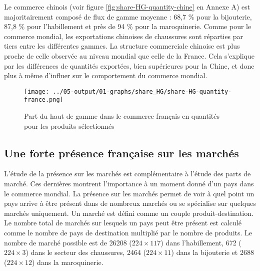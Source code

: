 \documentclass[french,10pt,a4paper]{article}
\begin{document}
Le commerce chinois (voir figure \ref{fig:share-HG-quantity-chine} en Annexe A) est majoritairement composé de flux de gamme moyenne : 68,7 \% pour la bijouterie, 87,8 \% pour l'habillement et près de 94 \% pour la maroquinerie. Comme pour le commerce mondial, les exportations chinoises de chaussures sont réparties par tiers entre les différentes gammes. La structure commerciale chinoise est plus proche de celle observée au niveau mondial que celle de la France. Cela s'explique par les différences de quantités exportées, bien supérieures pour la Chine, et donc plus à même d'influer sur le comportement du commerce mondial. 

\begin{figure}[!h]
  \centering
  \texttt{[image: ../05-output/01-graphs/share\_HG/share-HG-quantity-france.png]}
  \caption{Part du haut de gamme dans le commerce français en quantités pour les produits sélectionnés}
  \label{fig:share-HG-quantity-france}
\end{figure}


\subsection{Une forte présence française sur les marchés}
L'étude de la présence sur les marchés est complémentaire à l'étude des parts de marché. Ces dernières montrent l'importance à un moment donné d'un pays dans le commerce mondial. La présence sur les marchés permet de voir à quel point un pays arrive à être présent dans de nombreux marchés ou se spécialise sur quelques marchés uniquement. Un marché est défini comme un couple produit-destination. Le nombre total de marchés sur lesquels un pays peut être présent est calculé comme le nombre de pays de destination multiplié par le nombre de produits. Le nombre de marché possible est de 26208 ($224 \times 117$) dans l'habillement, 672 ($224 \times 3$) dans le secteur des chaussures, 2464 ($224 \times 11$) dans la bijouterie et 2688 ($224 \times 12$) dans la maroquinerie.

\bigskip
\end{document}
